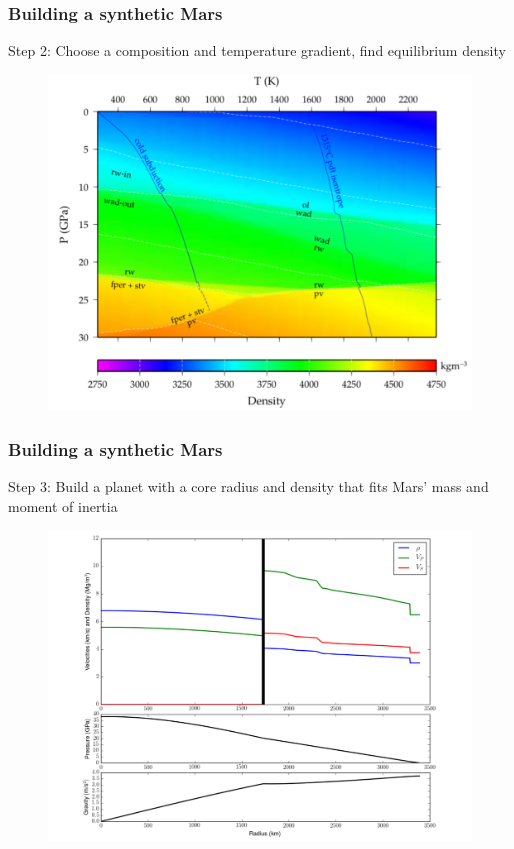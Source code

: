 \documentclass[compress,framenumber]{beamer}
\begin{document}
\begin{frame}
  \frametitle{Building a synthetic Mars}

  Step 2: Choose a composition and temperature gradient, find equilibrium density
  \vspace{-1.0em}
  \begin{figure}
    \includegraphics[width=0.7\linewidth]{figures/P_T_rho.pdf}
  \end{figure}
\end{frame}


\begin{frame}
  \frametitle{Building a synthetic Mars}
  Step 3: Build a planet with a core radius and density that fits
  Mars' mass and moment of inertia
  \vspace{-0.5em}
  \begin{figure}
    \includegraphics[width=0.7\linewidth]{figures/example_profile.pdf}
  \end{figure}
\end{frame}
\end{document}
